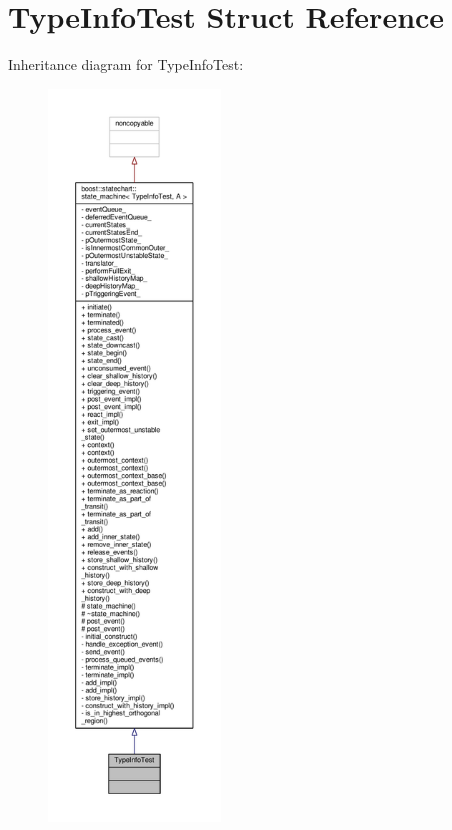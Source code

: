 \hypertarget{struct_type_info_test}{}\section{Type\+Info\+Test Struct Reference}
\label{struct_type_info_test}


Inheritance diagram for Type\+Info\+Test\+:
\nopagebreak
\begin{figure}[H]
\begin{center}
\leavevmode
\includegraphics[height=550pt]{struct_type_info_test__inherit__graph}
\end{center}
\end{figure}


